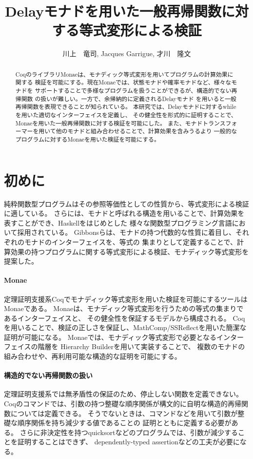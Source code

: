 \documentclass[japanese]{jssst_ppl}
\title{Delayモナドを用いた一般再帰関数に対する等式変形による検証}
\author{川上　竜司, Jacques Garrigue, 才川　隆文}
\theoremstyle{definition}
\def\coqin#1{\text{\texttt{#1}}}
\begin{document}
\maketitle
\begin{abstract}
  CoqのライブラリMonaeは、モナディック等式変形を用いてプログラムの計算効果に関する
  検証を可能にする。現在Monaeでは、状態モナドや確率モナドなど、様々なモナドを
  サポートすることで多様なプログラムを扱うことができるが、構造的でない再帰関数
  の扱いが難しい。一方で、余帰納的に定義されるDelayモナド
  を用いると一般再帰関数を表現できることが知られている。
  本研究では、Delayモナドに対するwhileを用いた適切なインターフェイスを定義し、
  その健全性を形式的に証明することで、Monaeを用いた一般再帰関数に対する検証を可能にした。
  また、モナドトランスフォーマーを用いて他のモナドと組み合わせることで、計算効果を含みうるより
  一般的なプログラムに対するMonaeを用いた検証を可能にする。
\end{abstract}

\section{初めに}
純粋関数型プログラムはその参照等価性としての性質から、等式変形による検証に適している。
さらには、モナドと呼ばれる構造を用いることで、計算効果を表すことができ、Haskellをはじめとした
様々な関数型プログラミング言語において採用されている。
Gibbonsらは、モナドの持つ代数的な性質に着目し、それぞれのモナドのインターフェイスを、等式の
集まりとして定義することで、計算効果の持つプログラムに関する等式変形による検証、モナディック等式変形を
提案した\cite{10.1145/2034574.2034777}。


\paragraph{Monae}
定理証明支援系Coqでモナディック等式変形を用いた検証を可能にするツールはMonae\cite{monae}である。
Monaeは、モナディック等式変形を行うための等式の集まりであるインターフェイスと、
その健全性を保証するモデルから構成される。
Coqを用いることで、検証の正しさを保証し、MathComp/SSReflectを用いた簡潔な証明が可能になる。
Monaeでは、モナディック等式変形で必要となるインターフェイスの階層を
Hierarchy Builder\cite{cohen:hal-02478907}を用いて実装することで、
複数のモナドの組み合わせや、再利用可能な構造的な証明を可能にする。
\paragraph{構造的でない再帰関数の扱い}
定理証明支援系では無矛盾性の保証のため、停止しない関数を定義できない。
Coqの\coqin{Fixpoint}コマンドでは、引数の持つ整礎な順序関係が構文的に自明な構造的再帰関数については定義できる。
そうでないときは、\coqin{Equation}コマンドなどを用いて引数が整礎な順序関係を持ち減少する値であることの
証明とともに定義する必要がある。
さらに非決定性を持つquicksortなどのプログラムでは、引数が減少することを証明することはできず、
dependently-typed assertion\cite{d}などの工夫が必要になる。
\end{document}
